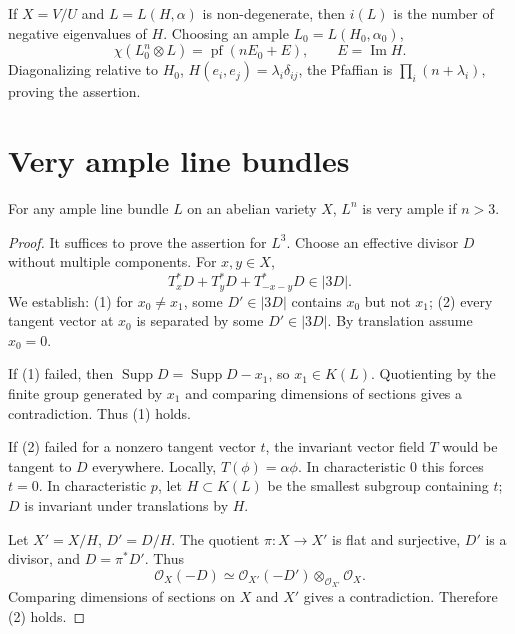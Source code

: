 \begin{corollary}
\label{mumford-cor-complex-index-negative-eigenvalues}
If $X=V/U$ and $L=L(H,\alpha)$ is non-degenerate, then $i(L)$ is the
number of negative eigenvalues of $H$. Choosing an ample
$L_0=L(H_0,\alpha_0)$,
\[
\chi(L_0^n\otimes L)=\operatorname{pf}(nE_0+E),
\qquad E=\operatorname{Im}H.
\]
Diagonalizing relative to $H_0$, $H(e_i,e_j)=\lambda_i\delta_{ij}$, the
Pfaffian is $\prod_i(n+\lambda_i)$, proving the assertion.
\end{corollary}

\section{Very ample line bundles}
\label{mumford-III17-source}

\begin{theorem}
\label{mumford-thm-high-power-very-ample}
For any ample line bundle $L$ on an abelian variety $X$, $L^n$ is very ample
if $n>3$.
\end{theorem}
\begin{proof}
It suffices to prove the assertion for $L^3$. Choose an effective divisor
$D$ without multiple components. For $x,y\in X$,
\[
T_x^*D+T_y^*D+T_{-x-y}^*D\in|3D|.
\]
We establish: (1) for $x_0\ne x_1$, some $D'\in|3D|$ contains $x_0$ but
not $x_1$; (2) every tangent vector at $x_0$ is separated by some
$D'\in|3D|$. By translation assume $x_0=0$.

If (1) failed, then $\operatorname{Supp}D=\operatorname{Supp}D-x_1$, so
$x_1\in K(L)$. Quotienting by the finite group generated by $x_1$ and
comparing dimensions of sections gives a contradiction. Thus (1) holds.

If (2) failed for a nonzero tangent vector $t$, the invariant vector field
$T$ would be tangent to $D$ everywhere. Locally, $T(\phi)=\alpha\phi$.
In characteristic $0$ this forces $t=0$. In characteristic $p$, let
$H\subset K(L)$ be the smallest subgroup containing $t$; $D$ is invariant
under translations by $H$.

Let $X'=X/H$, $D'=D/H$. The quotient $\pi:X\to X'$ is flat and
surjective, $D'$ is a divisor, and $D=\pi^*D'$. Thus
\[
\mathcal O_X(-D)\simeq
\mathcal O_{X'}(-D')\otimes_{\mathcal O_{X'}}\mathcal O_X.
\]
Comparing dimensions of sections on $X$ and $X'$ gives a contradiction.
Therefore (2) holds.
\end{proof}
